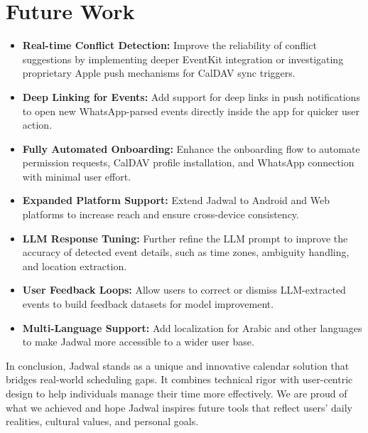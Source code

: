 \documentclass[12pt,a4paper,twoside]{report}
\begin{document}
\section*{Future Work}
\begin{itemize}
    \item \textbf{Real-time Conflict Detection:} Improve the reliability of conflict suggestions by implementing deeper EventKit integration or investigating proprietary Apple push mechanisms for CalDAV sync triggers.
    \item \textbf{Deep Linking for Events:} Add support for deep links in push notifications to open new WhatsApp-parsed events directly inside the app for quicker user action.
    \item \textbf{Fully Automated Onboarding:} Enhance the onboarding flow to automate permission requests, CalDAV profile installation, and WhatsApp connection with minimal user effort.
    \item \textbf{Expanded Platform Support:} Extend Jadwal to Android and Web platforms to increase reach and ensure cross-device consistency.
    \item \textbf{LLM Response Tuning:} Further refine the LLM prompt to improve the accuracy of detected event details, such as time zones, ambiguity handling, and location extraction.
    \item \textbf{User Feedback Loops:} Allow users to correct or dismiss LLM-extracted events to build feedback datasets for model improvement.
    \item \textbf{Multi-Language Support:} Add localization for Arabic and other languages to make Jadwal more accessible to a wider user base.
\end{itemize}

In conclusion, Jadwal stands as a unique and innovative calendar solution that bridges real-world scheduling gaps. It combines technical rigor with user-centric design to help individuals manage their time more effectively. We are proud of what we achieved and hope Jadwal inspires future tools that reflect users' daily realities, cultural values, and personal goals.





\end{document}
